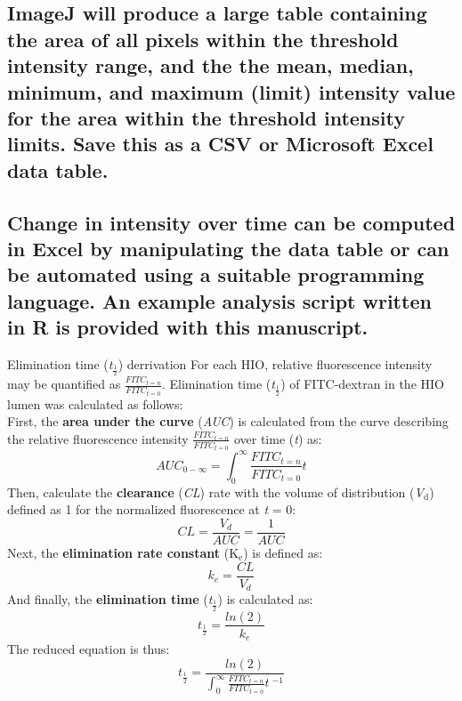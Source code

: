 \documentclass[11pt]{article}
\begin{document}
\subsection{{\sffamily } ImageJ will produce a large table containing the area of all pixels within the threshold intensity range, and the the mean, median, minimum, and maximum (limit) intensity value for the area within the threshold intensity limits. Save this as a CSV or Microsoft Excel data table.}
\label{sec:orgheadline72}
\subsection{{\sffamily } Change in intensity over time can be computed in Excel by manipulating the data table \supercite{winston2016microsoft} or can be automated using a suitable programming language. An example analysis script written in R\supercite{CRAN:2017} is provided with this manuscript.}
\label{sec:orgheadline73}
\begin{bclogo}[logo=\bccrayon, couleurBarre=gray!10, noborder=true, couleur=gray!10]{     Elimination time (\textit{t}$_\frac{1}{2}$) derrivation}
For each HIO, relative fluorescence intensity may be quantified as \(\frac{FITC_{t=n}}{FITC_{t=0}}\). Elimination time\supercite{rosenbaum2016basic} (\textit{t}\(_\frac{1}{2}\)) of FITC-dextran in the HIO lumen was calculated as follows:\\

First, the \textbf{area under the curve} (\emph{AUC}) is calculated from the curve describing the relative fluorescence intensity \(\frac{FITC_{t=n}}{FITC_{t=0}}\) over time (\emph{t}) as:\\
\begin{equation}
AUC_{0-\infty} =  \int_{0}^{\infty} \frac{FITC_{t=n}}{FITC_{t=0}}t
\end{equation}
Then, calculate the \textbf{clearance} (\emph{CL}) rate with the volume of distribution (\emph{V\(_{\text{d}}\)}) defined as 1 for the normalized fluorescence at \emph{t} = 0:\\
\begin{equation}
CL = \frac{V_d}{AUC} = \frac{1}{AUC}
\end{equation}
Next, the \textbf{elimination rate constant} (K\(_{\text{e}}\)) is defined as:\\
\begin{equation}
k_e = \frac{CL}{V_d}
\end{equation}
And finally, the \textbf{elimination time} (\textit{t}\(_\frac{1}{2}\)) is calculated as:\\
\begin{equation}
t_{\frac{1}{2}} = \frac{ln(2)}{k_e}
\end{equation}
The reduced equation is thus:\\
\begin{equation}
t_{\frac{1}{2}} = \frac{ln(2)}{{\int_{0}^{\infty} \frac{FITC_{t=n}}{FITC_{t=0}}t\:^{-1}}}
\end{equation}

\end{bclogo}
\end{document}
